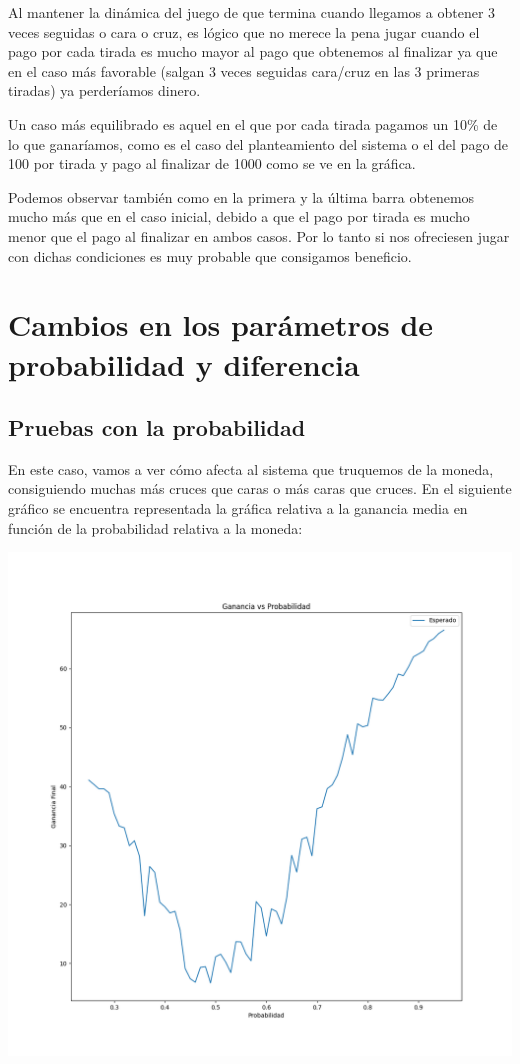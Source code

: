 \documentclass[11pt,a4paper]{report}
\begin{document}
Al mantener la dinámica del juego de que termina cuando llegamos a obtener 3 veces seguidas o cara o cruz, es lógico que no merece la pena jugar cuando el pago por cada tirada es mucho mayor al pago que obtenemos al finalizar ya que en el caso más favorable (salgan 3 veces seguidas cara/cruz en las 3 primeras tiradas) ya perderíamos dinero.

Un caso más equilibrado es aquel en el que por cada tirada pagamos un 10\% de lo que ganaríamos, como es el caso del planteamiento del sistema o el del pago de 100 por tirada y pago al finalizar de 1000 como se ve en la gráfica.

Podemos observar también como en la primera y la última barra obtenemos mucho más que en el caso inicial, debido a que el pago por tirada es mucho menor que el pago al finalizar en ambos casos. Por lo tanto si nos ofreciesen jugar con dichas condiciones es muy probable que consigamos beneficio.
\newpage
\section{Cambios en los parámetros de probabilidad y diferencia}
\subsection{Pruebas con la probabilidad}
En este caso, vamos a ver cómo afecta al sistema que truquemos de la moneda, consiguiendo muchas más cruces que caras o más caras que cruces. En el siguiente gráfico se encuentra representada la gráfica relativa a la ganancia media en función de la probabilidad relativa a la moneda:

\begin{center}
	\includegraphics[width=0.6\textheight]{img/Cap-1/3-ganancia-vs-probabilidad.png}
\end{center}
\end{document}
